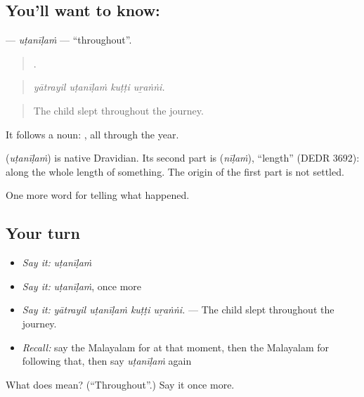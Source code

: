 \subsection*{You'll want to know: }
\textbf{} — \emph{uṭanīḷaṁ} — \textquotedblleft{}throughout\textquotedblright{}.

\begin{quote}
   .
\end{quote}

\begin{quote}
\emph{yātrayil uṭanīḷaṁ kuṭṭi uṟaṅṅi.}
\end{quote}

\begin{quote}
The child slept throughout the journey.
\end{quote}

It follows a noun:  , all through the year.

\begin{cousinweb}
\textbf{} (\emph{uṭanīḷaṁ}) is native Dravidian. Its second part is  (\emph{nīḷaṁ}), \textquotedblleft{}length\textquotedblright{} (DEDR 3692): along the whole length of something. The origin of the first part is not settled.
\end{cousinweb}

\begin{grammarlens}[title={What you've built}]
One more word for telling what happened.
\end{grammarlens}

\subsection*{Your turn}
\begin{itemize}
\raggedright
  \item \emph{Say it:} \emph{uṭanīḷaṁ}
  \item \emph{Say it:} \emph{uṭanīḷaṁ}, once more
  \item \emph{Say it:} \emph{yātrayil uṭanīḷaṁ kuṭṭi uṟaṅṅi.} — The child slept throughout the journey.
  \item \emph{Recall:} say the Malayalam for at that moment, then the Malayalam for following that, then say \emph{uṭanīḷaṁ} again
\end{itemize}

\begin{tcolorbox}[breakable,colback=teal!4,colframe=teal!35!black,title={Before you move on}]
What does  mean? (\textquotedblleft{}Throughout\textquotedblright{}.) Say it once more.
\end{tcolorbox}
